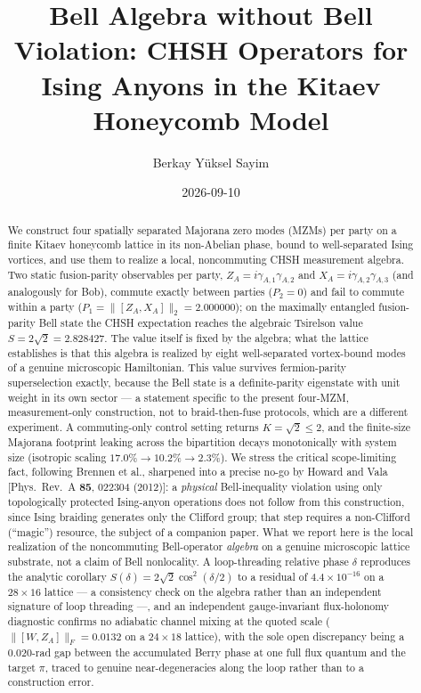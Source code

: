 \documentclass[aps,pra,twocolumn,superscriptaddress,floatfix,nofootinbib]{revtex4-2}
\begin{document}
\setcounter{secnumdepth}{3}

\title{Bell Algebra without Bell Violation: CHSH Operators for Ising Anyons in the Kitaev Honeycomb Model}

\author{Berkay Y\"uksel Sayim}

\date{2026-09-10}

\begin{abstract}
We construct four spatially separated Majorana zero modes (MZMs) per
party on a finite Kitaev honeycomb lattice in its non-Abelian phase,
bound to well-separated Ising vortices, and use them to realize a
local, noncommuting CHSH measurement algebra. Two static fusion-parity
observables per party, $Z_A=i\gamma_{A,1}\gamma_{A,2}$ and
$X_A=i\gamma_{A,2}\gamma_{A,3}$ (and analogously for Bob), commute
exactly between parties ($P_2=0$) and fail to commute within a party
($P_1=\lVert[Z_A,X_A]\rVert_2=2.000000$); on the maximally entangled
fusion-parity Bell state the CHSH expectation reaches the algebraic
Tsirelson value $S=2\sqrt2=2.828427$. The value itself is fixed by the
algebra; what the lattice establishes is that this algebra is realized
by eight well-separated vortex-bound modes of a genuine microscopic
Hamiltonian. This value survives fermion-parity
superselection exactly, because the Bell state is a definite-parity
eigenstate with unit weight in its own sector --- a statement specific
to the present four-MZM, measurement-only construction, not to
braid-then-fuse protocols, which are a different experiment. A
commuting-only control
setting returns $K=\sqrt2\le2$, and the finite-size Majorana footprint
leaking across the bipartition decays monotonically with system size
(isotropic scaling $17.0\%\to10.2\%\to2.3\%$). We stress the critical
scope-limiting fact, following Brennen et al., sharpened into a precise no-go by Howard and
Vala [Phys.\ Rev.\ A \textbf{85}, 022304 (2012)]: a \emph{physical} Bell-inequality violation
using only topologically protected Ising-anyon operations does not
follow from this construction, since Ising braiding generates only the
Clifford group; that step requires a non-Clifford (``magic'') resource,
the subject of a companion paper. What we report here is the local
realization of the noncommuting Bell-operator \emph{algebra} on a
genuine microscopic lattice substrate, not a claim of Bell nonlocality.
A loop-threading relative phase $\delta$ reproduces the analytic
corollary $S(\delta)=2\sqrt2\cos^2(\delta/2)$ to a residual of
$4.4\times10^{-16}$ on a $28\times16$ lattice --- a consistency check on
the algebra rather than
an independent signature of loop threading ---, and an independent
gauge-invariant flux-holonomy
diagnostic confirms no adiabatic channel mixing at the quoted scale
($\lVert[W,Z_A]\rVert_F=0.0132$ on a $24\times18$ lattice), with the
sole open discrepancy being a
$0.020$-rad gap between the accumulated Berry phase at one full flux
quantum and the target $\pi$, traced to genuine near-degeneracies along
the loop rather than to a construction error.
\end{abstract}
\end{document}
